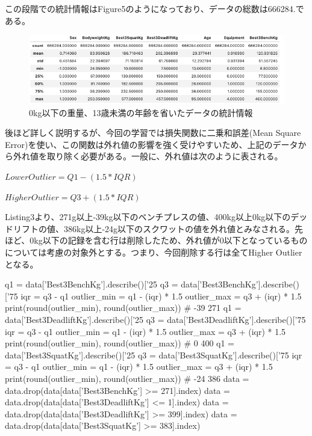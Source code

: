 \documentclass{article}
\begin{document}
この段階での統計情報はFigure5のようになっており、データの総数は666284.である。


\begin{figure}[H]
\begin{center}
\includegraphics[width=\linewidth]{data_stats2.png}
\caption{0kg以下の重量、13歳未満の年齢を省いたデータの統計情報}
\end{center}
\end{figure}

後ほど詳しく説明するが、今回の学習では損失関数に二乗和誤差(Mean Square Error)を使い、この関数は外れ値の影響を強く受けやすいため、上記のデータから外れ値を取り除く必要がある。一般に、外れ値は次のように表される。

\begin{center}
\begin{math}
Lower Outlier = Q1 - (1.5 * IQR)
\end{math}
\end{center}
\begin{center}
\begin{math}
Higher Outlier = Q3 + (1.5 * IQR)
\end{math}
\end{center}


Listing3より、271g以上-39kg以下のベンチプレスの値、400kg以上0kg以下のデッドリフトの値、386kg以上-24g以下のスクワットの値を外れ値とみなされる。先ほど、0kg以下の記録を含む行は削除したため、外れ値が0以下となっているものについては考慮の対象外とする。つまり、今回削除する行は全てHigher Outlierとなる。
\\


\begin{python}[caption=外れ値の削除]
q1 = data['Best3BenchKg'].describe()['25%
q3 = data['Best3BenchKg'].describe()['75%
iqr = q3 - q1
outlier_min = q1 - (iqr) * 1.5
outlier_max = q3 + (iqr) * 1.5
print(round(outlier_min), round(outlier_max))
# -39 271
q1 = data['Best3DeadliftKg'].describe()['25%
q3 = data['Best3DeadliftKg'].describe()['75%
iqr = q3 - q1
outlier_min = q1 - (iqr) * 1.5
outlier_max = q3 + (iqr) * 1.5
print(round(outlier_min), round(outlier_max))
# 0 400
q1 = data['Best3SquatKg'].describe()['25%
q3 = data['Best3SquatKg'].describe()['75%
iqr = q3 - q1
outlier_min = q1 - (iqr) * 1.5
outlier_max = q3 + (iqr) * 1.5
print(round(outlier_min), round(outlier_max))
# -24 386
data = data.drop(data[data['Best3BenchKg'] >= 271].index)
data = data.drop(data[data['Best3DeadliftKg'] <= 1].index)
data = data.drop(data[data['Best3DeadliftKg'] >= 399].index)
data = data.drop(data[data['Best3SquatKg'] >= 383].index)
\end{python}
\end{document}
